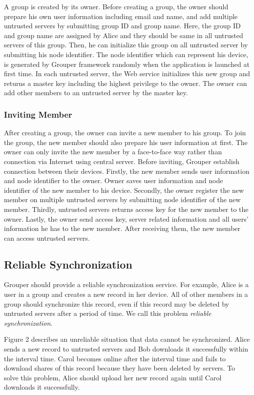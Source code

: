 \documentclass[twocolumn,10pt]{article}
\begin{document}
A group is created by its owner. Before creating a group, the owner should prepare his own user information including email and name, and add multiple untrusted servers by submitting group ID and group name. Here, the group ID and group name are assigned by Alice and they should be same in all untrusted servers of this group. Then, he can initialize this group on all untrusted server by submitting his node identifier. The node identifier which can represent his device, is generated by Grouper framework randomly when the application is launched at first time. In each untrusted server, the Web service initializes this new group and returns a master key including the highest privilege to the owner. The owner can add other members to an untrusted server by the master key.

\subsubsection{Inviting Member}

After creating a group, the owner can invite a new member to his group. To join the group, the new member should also prepare his user information at first. The owner can only invite the new member by a face-to-face way rather than connection via Internet using central server. Before inviting, Grouper establish connection between their devices. Firstly, the new member sends user information and node identifier to the owner. Owner saves user information and node identifier of the new member to his device. Secondly, the owner register the new member on multiple untrusted servers by submitting node identifier of the new member. Thirdly, untrusted servers returns access key for the new member to the owner. Lastly, the owner send access key, server related information and all users' information he has to the new member. After receiving them, the new member can access untrusted servers.

\subsection{Reliable Synchronization}
Grouper should provide a reliable synchronization service. For example, Alice is a user in a group and creates a new record in her device. All of other members in a group should synchronize this record, even if this record may be deleted by untrusted servers after a period of time. We call this problem \emph{reliable synchronization}.

Figure 2 describes an unreliable situation that data cannot be synchronized. Alice sends a new record to untrusted servers and Bob downloads it successfully within the interval time. Carol becomes online after the interval time and fails to download shares of this record because they have been deleted by servers. To solve this problem, Alice should upload her new record again until Carol downloads it successfully.
\end{document}

